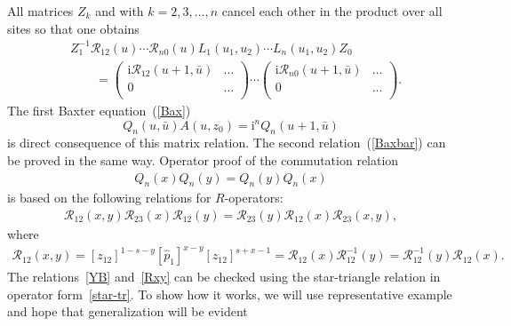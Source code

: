 \documentclass[10pt,a4paper]{amsart}
\renewcommand{\imath}{\mathrm{i}}
\numberwithin{equation}{section}
\begin{document}
All matrices $Z_k$ and  with $k=2,3,\dots,n$ cancel
each other in the product over all sites so that one obtains
\begin{align*}
&
Z_1^{-1} \mathcal{R}_{12}( u)\cdots
\mathcal{R}_{n0}( u)
L_1(u_1 ,u_2)\cdots L_n(u_1 ,u_2) Z_0 \\
&
\qquad{} =
\begin{pmatrix}
\imath\mathcal{R}_{12}(u+1,\bar{u}) & \dots \\
 0 & \dots \\
\end{pmatrix}
\cdots
\begin{pmatrix}
\imath\mathcal{R}_{n0}(u+1,\bar{u}) & \dots \\
 0 & \dots \\
\end{pmatrix} .
\end{align*}
The first Baxter equation~(\ref{Bax})
\begin{equation*}
Q_n(u,\bar{u}) A(u ,z_0) = \imath^n Q_n(u+1,\bar{u})
\end{equation*}
is direct consequence of this matrix relation.
The second relation~(\ref{Baxbar}) can be proved in the same way.
Operator proof of the commutation relation
\begin{align}\label{com}
Q_n( x) Q_n( y) = Q_n(y) Q_n(x)
\end{align}
is based on the following relations for $R$-operators:
\begin{align}\label{YB}
\mathcal{R}_{12}(x,y) \mathcal{R}_{23}(x) \mathcal{R}_{12}(y) =
\mathcal{R}_{23}(y) \mathcal{R}_{12}(x) \mathcal{R}_{23}(x,y) ,
\end{align}
where
\begin{align}\label{Rxy}
\mathcal{R}_{12}(x,y) = [z_{12}]^{1-s-y} [\hat{p}_1]^{x-y} [z_{12}]^{s+x-1} = \mathcal{R}_{12}(x) \mathcal{R}^{-1}_{12}(y) =
\mathcal{R}^{-1}_{12}(y) \mathcal{R}_{12}(x) .
\end{align}
The relations~\eqref{YB} and~\eqref{Rxy} can be checked using the
star-triangle relation in operator form~\eqref{star-tr}.
To show how it works, we will use representative example
and hope that generalization will be evident
\end{document}

